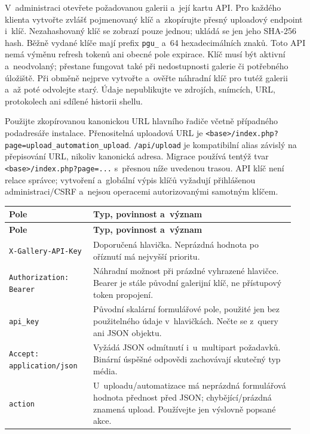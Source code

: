 \documentclass[11pt,a4paper]{article}
\newcommand{\codeword}[1]{\nolinkurl{#1}}
\begin{document}
V~administraci otevřete požadovanou galerii a~její kartu API. Pro každého klienta vytvořte
zvlášť pojmenovaný klíč a~zkopírujte přesný uploadový endpoint i~klíč. Nezahashovaný klíč se
zobrazí pouze jednou; ukládá se jen jeho SHA-256 hash. Běžně vydané klíče mají prefix
\codeword{pgu_} a~64 hexadecimálních znaků. Toto API nemá výměnu refresh tokenů ani obecné
pole expirace. Klíč musí být aktivní a~neodvolaný; přestane fungovat také při nedostupnosti
galerie či potřebného úložiště. Při obměně nejprve vytvořte a~ověřte náhradní klíč pro tutéž
galerii a~až poté odvolejte starý. Údaje nepublikujte ve zdrojích, snímcích, URL,
protokolech ani sdílené historii shellu.

Použijte zkopírovanou kanonickou URL hlavního řadiče včetně případného podadresáře
instalace. Přenositelná uploadová URL je
\codeword{<base>/index.php?page=upload_automation_upload}. \codeword{/api/upload} je
kompatibilní alias závislý na přepisování URL, nikoliv kanonická adresa. Migrace používá
tentýž tvar \codeword{<base>/index.php?page=...} s~přesnou níže uvedenou trasou. API klíč
není relace správce; vytvoření a~globální výpis klíčů vyžadují přihlášenou administraci/CSRF
a~nejsou operacemi autorizovanými samotným klíčem.

\begin{longtable}{@{}>{\RaggedRight\arraybackslash}p{0.28\linewidth}>{\RaggedRight\arraybackslash}p{0.67\linewidth}@{}}
\toprule
\textbf{Pole} & \textbf{Typ, povinnost a~význam} \\
\midrule
\endfirsthead
\toprule
\textbf{Pole} & \textbf{Typ, povinnost a~význam} \\
\midrule
\endhead
\bottomrule
\endfoot
\codeword{X-Gallery-API-Key} & Doporučená hlavička. Neprázdná hodnota po oříznutí má
nejvyšší prioritu. \\
\codeword{Authorization: Bearer} & Náhradní možnost při prázdné vyhrazené hlavičce. Bearer
je stále původní galerijní klíč, ne přístupový token propojení. \\
\codeword{api_key} & Původní skalární formulářové pole, použité jen bez použitelného údaje
v~hlavičkách. Nečte se z~query ani JSON objektu. \\
\codeword{Accept: application/json} & Vyžádá JSON odmítnutí i~u~multipart požadavků. Binární
úspěšné odpovědi zachovávají skutečný typ média. \\
\codeword{action} & U~uploadu/automatizace má neprázdná formulářová hodnota přednost před
JSON; chybějící/prázdná znamená upload. Používejte jen výslovně popsané akce. \\
\end{longtable}
\end{document}
